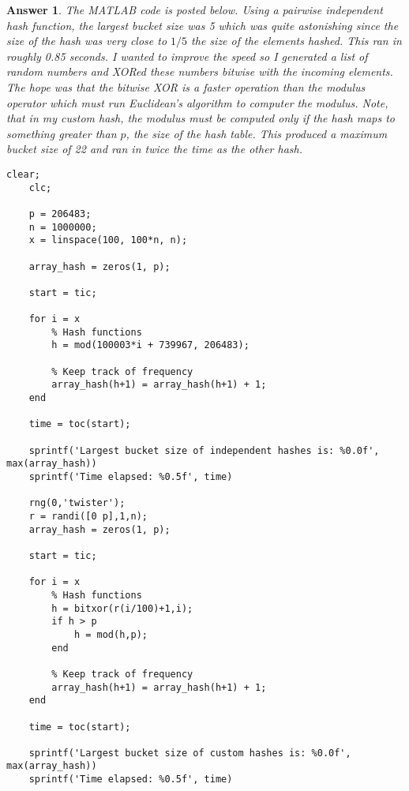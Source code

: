 \documentclass[12pt]{article}
\theoremstyle{colon}
\newtheorem*{answer}{Answer}
\begin{document}
\begin{answer}
  The MATLAB code is posted below. Using a pairwise independent hash function, the largest bucket size was 5 which was quite astonishing since the size of the hash was very close to $1/5$ the size of the elements hashed. This ran in roughly 0.85 seconds. I wanted to improve the speed so I generated a list of random numbers and XORed these numbers bitwise with the incoming elements. The hope was that the bitwise XOR is a faster operation than the modulus operator which must run Euclidean's algorithm to computer the modulus. Note, that in my custom hash, the modulus must be computed only if the hash maps to something greater than $p$, the size of the hash table. This produced a maximum bucket size of 22 and ran in twice the time as the other hash.

  \begin{lstlisting}[style=Matlab-editor, basicstyle=\scriptsize]
    clear;
    clc;

    p = 206483;
    n = 1000000;
    x = linspace(100, 100*n, n);

    array_hash = zeros(1, p);

    start = tic;

    for i = x
        % Hash functions
        h = mod(100003*i + 739967, 206483);

        % Keep track of frequency
        array_hash(h+1) = array_hash(h+1) + 1;
    end

    time = toc(start);

    sprintf('Largest bucket size of independent hashes is: %0.0f', max(array_hash))
    sprintf('Time elapsed: %0.5f', time)

    rng(0,'twister');
    r = randi([0 p],1,n);
    array_hash = zeros(1, p);

    start = tic;

    for i = x
        % Hash functions
        h = bitxor(r(i/100)+1,i);
        if h > p
            h = mod(h,p);
        end

        % Keep track of frequency
        array_hash(h+1) = array_hash(h+1) + 1;
    end

    time = toc(start);

    sprintf('Largest bucket size of custom hashes is: %0.0f', max(array_hash))
    sprintf('Time elapsed: %0.5f', time)
  \end{lstlisting}
\end{answer}
\end{document}
